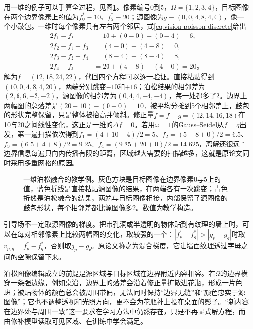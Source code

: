 用一维的例子可以手算全过程，见图\ref{fig:vision-poisson-1d}。像素编号0到5，$\Omega=\{1,2,3,4\}$，目标图像在两个边界像素上的值为$f^*_0=10$、$f^*_5=20$；源图像为$g=(0,0,4,8,4,0)$，像一个小鼓包。一维时每个像素只有左右两个邻居，式\eqref{eq:vision-poisson-discrete}给出
\begin{equation*}
 \begin{aligned}
 2f_1-f_2&=10+(0-0)+(0-4)=6,\\
 2f_2-f_1-f_3&=(4-0)+(4-8)=0,\\
 2f_3-f_2-f_4&=(8-4)+(8-4)=8,\\
 2f_4-f_3&=20+(4-8)+(4-0)=20\text{。}
 \end{aligned}
\end{equation*}
解为$f=(12,18,24,22)$，代回四个方程可以逐一验证。直接粘贴得到$(10,0,4,8,4,20)$，两端分别跳变$-10$和$+16$；泊松结果的相邻差为$(2,6,6,-2,-2)$，源图像的相邻差为$(0,4,4,-4,-4)$，每一处都多了2。边界上两幅图的总落差是$(20-10)-(0-0)=10$，被平均分摊到5个相邻差上，鼓包的形状完整保留，只是整体被抬高并倾斜。修正量$\tilde f=f-g=(12,14,16,18)$在10与20之间线性变化，这正是一维的$\Delta\tilde f=0$。若用$\omega=1$的Gauss–Seidel从$f=g$出发，第一遍扫描依次得到$f_1=(4+10-4)/2=5$、$f_2=(5+8+0)/2=6.5$、$f_3=(6.5+4+8)/2=9.25$、$f_4=(9.25+20+0)/2=14.625$，离解还很远：边界信息每遍只向内传播有限的距离，区域越大需要的扫描越多，这就是原论文同时采用多重网格的原因。

\begin{figure}[htbp]
 \centering
 
 \caption{一维泊松融合的教学例。灰色方块是目标图像在边界像素0与5上的值，蓝色折线是直接粘贴源图像的结果，在两端各有一次跳变；青色折线是泊松融合的结果，两端与目标图像相接，内部保留了源图像的鼓包形状，每个相邻差都比源图像多2。数值为教学构造。}
 \label{fig:vision-poisson-1d}
\end{figure}

引导场不一定取源图像的梯度。把带孔洞或半透明的物体贴到有纹理的墙上时，可以在每对相邻像素上比较两幅图的变化，取较强的一个：$|f^*_p-f^*_q|>|g_p-g_q|$时取$v_{p,q}=f^*_p-f^*_q$，否则取$g_p-g_q$。原论文称之为混合梯度，它让墙面纹理透过字母之间的空隙保留下来。

泊松图像编辑成立的前提是源区域与目标区域在边界附近内容相容。若$\Omega$的边界横穿一条强边缘，例如桌沿，边界上的落差会沿着修正量扩散进花瓶，形成一片色斑；被贴物体的颜色总会被周围带偏，无法同时保持“边界无缝”和“颜色忠实于源图像”；它也不调整透视和光照方向，更不会为花瓶补上投在桌面的影子。“新内容在边界处与周围一致”这一要求在学习方法中仍然存在，只是不再显式解方程，而由修补模型读取可见区域、在训练中学会满足。

